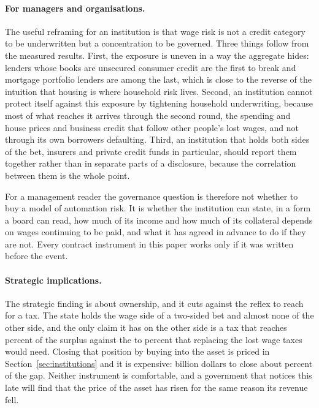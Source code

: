 \paragraph{For managers and organisations.} The useful reframing for an institution is that wage
risk is not a credit category to be underwritten but a concentration to be governed. Three things
follow from the measured results. First, the exposure is uneven in a way the aggregate hides:
lenders whose books are unsecured consumer credit are the first to break and mortgage portfolio
lenders are among the last, which is close to the reverse of the intuition that housing is where
household risk lives. Second, an institution cannot protect itself against this exposure by
tightening household underwriting, because most of what reaches it arrives through the second
round, the spending and house prices and business credit that follow other people's lost wages,
and not through its own borrowers defaulting. Third, an institution that holds both sides of the
bet, insurers and private credit funds in particular, should report them together rather than in
separate parts of a disclosure, because the correlation between them is the whole point.

For a management reader the governance question is therefore not whether to buy a model of
automation risk. It is whether the institution can state, in a form a board can read, how much of
its income and how much of its collateral depends on wages continuing to be paid, and what it has
agreed in advance to do if they are not. Every contract instrument in this paper works only if it
was written before the event.

\paragraph{Strategic implications.} The strategic finding is about ownership, and it cuts against
the reflex to reach for a tax. The state holds the wage side of a two-sided bet and almost none of
the other side, and the only claim it has on the other side is a tax that reaches
 percent of the surplus against the  to
 percent that replacing the lost wage taxes would need. Closing that position
by buying into the asset is priced in Section~\ref{sec:institutions} and it is expensive:
 billion dollars to close about  percent of the
gap. Neither instrument is comfortable, and a government that notices this late will find that the
price of the asset has risen for the same reason its revenue fell.

